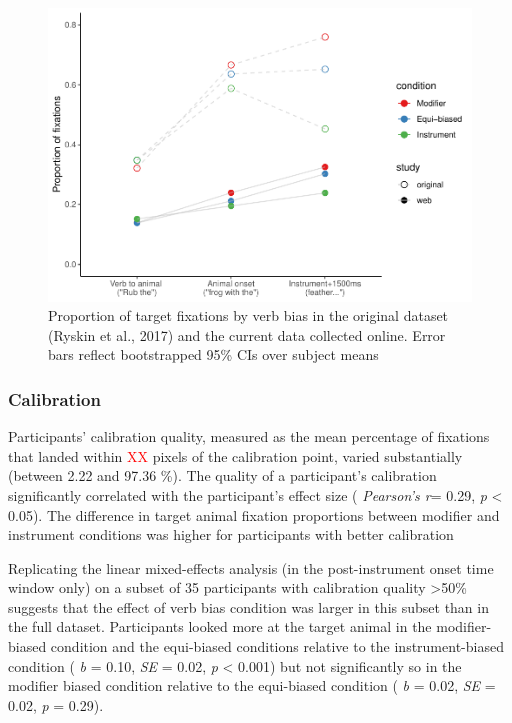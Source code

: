 \documentclass[
  man,floatsintext]{apa6}
\begin{document}
\begin{figure}
\centering
\includegraphics{manuscript_files/figure-latex/E4-proportion-fix-by-window-both-1.pdf}
\caption{\label{fig:E4-proportion-fix-by-window-both}Proportion of target fixations by verb bias in the original dataset (Ryskin et al., 2017) and the current data collected online. Error bars reflect bootstrapped 95\% CIs over subject means}
\end{figure}

\hypertarget{calibration-3}{%
\subsubsection{Calibration}\label{calibration-3}}

Participants' calibration quality, measured as the mean percentage of fixations that landed within \textcolor{red}{XX} pixels of the calibration point, varied substantially (between 2.22 and 97.36 \%).
The quality of a participant's calibration significantly correlated with the participant's effect size ( \emph{Pearson's r}= 0.29, \emph{p} \textless{} 0.05).
The difference in target animal fixation proportions between modifier and instrument conditions was higher for participants with better calibration

Replicating the linear mixed-effects analysis (in the post-instrument onset time window only) on a subset of 35 participants with calibration quality \textgreater50\% suggests that the effect of verb bias condition was larger in this subset than in the full dataset. Participants looked more at the target animal in the modifier-biased condition and the equi-biased conditions relative to the instrument-biased condition ( \emph{b} = 0.10, \emph{SE} = 0.02, \emph{p} \textless{} 0.001) but not significantly so in the modifier biased condition relative to the equi-biased condition ( \emph{b} = 0.02, \emph{SE} = 0.02, \emph{p} = 0.29).
\end{document}
